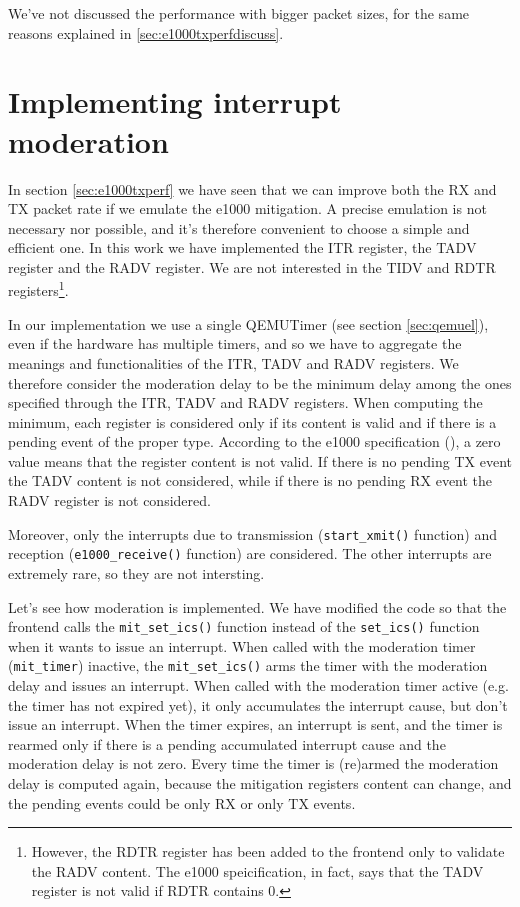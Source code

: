 \vspace{0.5cm}

We've not discussed the performance with bigger packet sizes, for the same reasons explained in \ref{sec:e1000txperfdiscuss}.



\section{Implementing interrupt moderation}
\label{sec:e1000-mit}
In section \ref{sec:e1000txperf} we have seen that we can improve both the RX and TX packet rate if we emulate the e1000 mitigation.
A precise emulation is not necessary nor possible, and it's therefore convenient to choose a simple and efficient one.
In this work we have implemented the ITR register, the TADV register and the RADV register.
We are not interested in the TIDV and RDTR registers\footnote{However, the RDTR register has been added to the frontend only to 
validate the RADV content. The e1000 speicification, in fact, says that the TADV register is not valid if RDTR contains 0.}.

\vspace{0.5cm}

In our implementation we use a single QEMUTimer (see section \ref{sec:qemuel}), even if the hardware has multiple timers, and so we have to 
aggregate the meanings and functionalities of the ITR, TADV and RADV registers.
We therefore consider the moderation delay to be the minimum delay among the ones specified through the ITR, TADV and RADV registers.
When computing the minimum, each register is considered only if its content is valid and if there is a pending event of the proper type.
According to the e1000 specification (\cite{ref:e1000}), a zero value means that the register content is not valid. If there is no pending 
TX event the TADV content is not considered, while if there is no pending RX event the RADV register is not considered.

Moreover, only the interrupts due to transmission (\texttt{start\_xmit()} function) and reception (\texttt{e1000\_receive()}
function) are considered. The other interrupts are extremely rare, so they are not intersting.


\vspace{0.5cm}
Let's see how moderation is implemented. We have modified the code so that the frontend calls the \texttt{mit\_set\_ics()} function instead
of the \texttt{set\_ics()} function when it wants to issue an interrupt.
When called with the moderation timer (\texttt{mit\_timer}) inactive, the \texttt{mit\_set\_ics()} arms the timer with the moderation delay
and issues  an interrupt.
When called with the moderation timer active (e.g. the timer has not expired yet), it only accumulates the interrupt cause, but don't issue 
an interrupt.
When the timer expires, an interrupt is sent, and the timer is rearmed only if there is a pending accumulated interrupt cause and
the moderation delay is not zero.
Every time the timer is (re)armed the moderation delay is computed again, because the mitigation registers content can change, and
the pending events could be only RX or only TX events.

